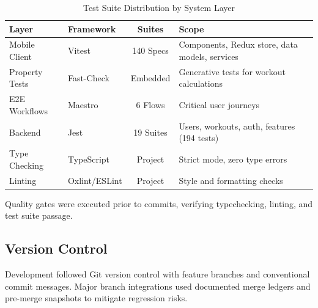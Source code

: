 \begin{table}[htbp]
    \centering
    \caption{Test Suite Distribution by System Layer}
    \label{tab:test-distribution}
    \begin{tabular}{|l|l|c|p{2.5in}|}
        \hline
        \textbf{Layer} & \textbf{Framework} & \textbf{Suites} & \textbf{Scope} \\
        \hline
        Mobile Client & Vitest & 140 Specs & Components, Redux store, data models, services \\
        \hline
        Property Tests & Fast-Check & Embedded & Generative tests for workout calculations \\
        \hline
        E2E Workflows & Maestro & 6 Flows & Critical user journeys \\
        \hline
        Backend & Jest & 19 Suites & Users, workouts, auth, features (194 tests) \\
        \hline
        Type Checking & TypeScript & Project & Strict mode, zero type errors \\
        \hline
        Linting & Oxlint/ESLint & Project & Style and formatting checks \\
        \hline
    \end{tabular}
\end{table}

Quality gates were executed prior to commits, verifying typechecking, linting, and test suite passage.

\subsection{Version Control}
Development followed Git version control with feature branches and conventional commit messages. Major branch integrations used documented merge ledgers and pre-merge snapshots to mitigate regression risks.
